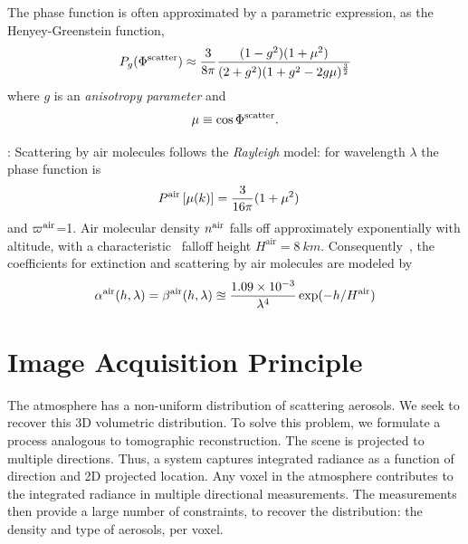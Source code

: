 \documentclass[10pt,twocolumn,letterpaper]{article}
\begin{document}
The phase function is often approximated by a parametric expression, as the Henyey-Greenstein function,
\begin{align}
  P_g(\Phi^{\rm scatter})\approx
   \frac{3} {8\pi}
   \frac{(1 - g^2)(1+\mu^2)}
        {(2+g^2)(1 + g^2 - 2g\mu)^\frac{3}{2}}
  \label{eq:aerosol_scatter}
\end{align}
where $g$ is an {\em anisotropy parameter} and
\begin{align}
  \mu\equiv \cos \Phi^{\rm scatter}.
   \label{eq:mu}
\end{align}

: Scattering by air molecules follows the {\em Rayleigh} model: for wavelength $\lambda$ the phase function is
\begin{align}
  P^{\rm air}\left[\mu(k)\right] &= \frac{3}{16\pi}(1+\mu^2)
  \label{eq:rayleighP}
\end{align}
and $\varpi^{\rm air}$=1. Air molecular density $n^{\rm air}$ falls off approximately exponentially with altitude, with a characteristic~\cite{Levi1980} falloff height $H^\mathrm{air}=8\ km$. Consequently~\cite{Levi1980}, the coefficients for extinction and scattering by air molecules are modeled by
\begin{align}
  \alpha^{\rm air}(h, \lambda)=\beta^{\rm air}(h, \lambda)
  \approxeq
  \frac{1.09 \times 10^{-3}}{\lambda^4}
  \exp(-h/H^\mathrm{air})  %
  \label{eq:rayleighbeta}
\end{align}

\section{Image Acquisition Principle}
\label{sec:setup} \vspace{-0.2cm}

The atmosphere has a non-uniform distribution of scattering aerosols. We seek to recover this 3D volumetric distribution. To solve this problem, we formulate a process analogous to tomographic reconstruction. The scene is projected to multiple directions. Thus, a system captures integrated radiance as a function of direction and 2D projected location. Any voxel in the atmosphere contributes to the integrated radiance in multiple directional measurements. The measurements then provide a large number of constraints, to recover the distribution: the density and type of aerosols, per voxel.
\end{document}
